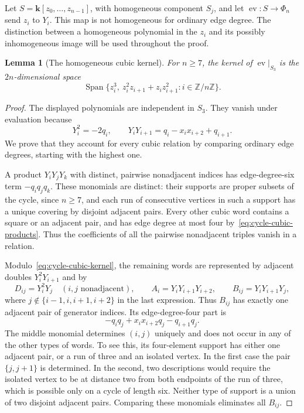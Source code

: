 \documentclass[reqno]{article}
\theoremstyle{plain} %
\newtheorem{lemma}[theorem]{Lemma}
\theoremstyle{definition}
\theoremstyle{remark}
\DeclareMathOperator{\Span}{Span}
\newcommand{\Z}{{\mathbb{Z}}}
\newcommand{\K} {\mathbf{k}}
\numberwithin{equation}{section}
\begin{document}
Let $S=\K[z_0,\ldots,z_{n-1}]$, with homogeneous component $S_j$, and
let $\operatorname{ev}:S\to\Phi_n$ send $z_i$ to $Y_i$. This map is
not homogeneous for ordinary edge degree. The distinction between a
homogeneous polynomial in the $z_i$ and its possibly inhomogeneous image
will be used throughout the proof.

\begin{lemma}[The homogeneous cubic kernel]\label{lem:cycle-cubic-kernel}
For $n\ge7$, the kernel of $\operatorname{ev}|_{S_3}$ is the
$2n$-dimensional space
\begin{equation}\label{eq:cycle-cubic-kernel}
 \Span\{z_i^3,\ z_i^2z_{i+1}+z_iz_{i+1}^2:i\in\Z/n\Z\}.
\end{equation}
\end{lemma}
\begin{proof}
The displayed polynomials are independent in $S_3$. They vanish under
evaluation because
\begin{equation}\label{eq:cycle-cubic-products}
 Y_i^2=-2q_i,\qquad
 Y_iY_{i+1}=q_i-x_ix_{i+2}+q_{i+1}.
\end{equation}
We prove that they account for every cubic relation by comparing ordinary
edge degrees, starting with the highest one.

A product $Y_iY_jY_k$ with distinct, pairwise nonadjacent indices has
edge-degree-six term $-q_iq_jq_k$. These monomials are distinct: their
supports are proper subsets of the cycle, since $n\ge7$, and each run
of consecutive vertices in such a support has a unique covering by
disjoint adjacent pairs. Every other cubic word contains a square or
an adjacent pair, and has edge degree at most four
by~\eqref{eq:cycle-cubic-products}. Thus the coefficients of all the
pairwise nonadjacent triples vanish in a relation.

Modulo~\eqref{eq:cycle-cubic-kernel}, the remaining words are represented
by adjacent doubles $Y_i^2Y_{i+1}$ and by
\[
 D_{ij}=Y_i^2Y_j\quad(i,j\text{ nonadjacent}),\qquad
 A_i=Y_iY_{i+1}Y_{i+2},\qquad
 B_{ij}=Y_iY_{i+1}Y_j,
\]
where $j\notin\{i-1,i,i+1,i+2\}$ in the last expression. Thus $B_{ij}$
has exactly one adjacent pair of generator indices. Its edge-degree-four
part is
\[
 -q_iq_j+x_ix_{i+2}q_j-q_{i+1}q_j.
\]
The middle monomial determines $(i,j)$ uniquely and does not occur in
any of the other types of words. To see this, its four-element support
has either one adjacent pair, or a run of three and an isolated vertex.
In the first case the pair $\{j,j+1\}$ is determined. In the second,
two descriptions would require the isolated vertex to be at distance
two from both endpoints of the run of three, which is possible only on
a cycle of length six. Neither type of support is a union of two
disjoint adjacent pairs. Comparing these monomials eliminates all
$B_{ij}$.


\end{proof}
\end{document}
